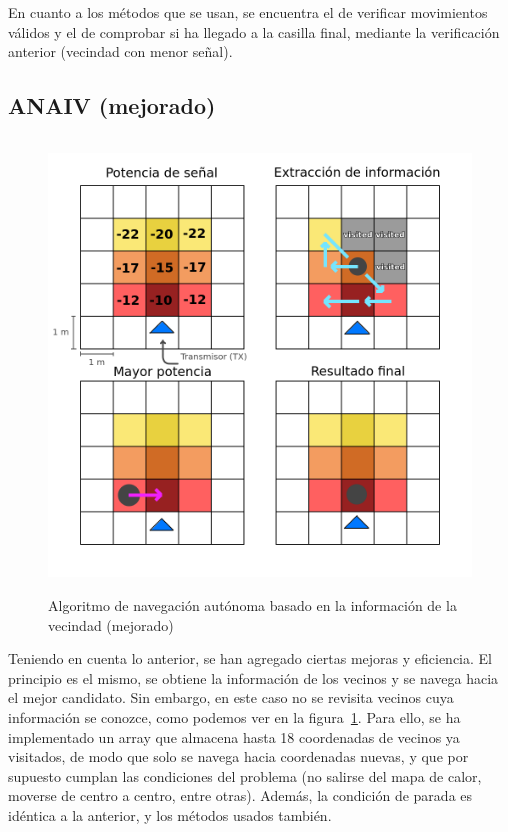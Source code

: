En cuanto a los métodos que se usan, se encuentra el de verificar movimientos válidos y el de comprobar si ha llegado a la casilla final, mediante la verificación anterior (vecindad con menor señal).\\

\subsection{\ac{ANAIV} (mejorado)}
\label{subsec:alg-manual-opt}

\begin{figure} [t]
    \begin{center}
    \includegraphics[height=12cm]{imagenes/cap4/10_algoritmo_optimizado.png}
    \end{center}
    \caption[Algoritmo de navegación autónoma basado en la información de la vecindad (mejorado)]{Algoritmo de navegación autónoma basado en la información de la vecindad (mejorado)}
    \label{fig:opt_algorithm}
\end{figure}

Teniendo en cuenta lo anterior, se han agregado ciertas mejoras y eficiencia. El principio es el mismo, se obtiene la información de los vecinos y se navega hacia el mejor candidato. Sin embargo, en este caso no se revisita vecinos cuya información se conozce, como podemos ver en la figura~\ref{fig:opt_algorithm}. Para ello, se ha implementado un array que almacena hasta 18 coordenadas de vecinos ya visitados, de modo que solo se navega hacia coordenadas nuevas, y que por supuesto cumplan las condiciones del problema (no salirse del mapa de calor, moverse de centro a centro, entre otras). Además, la condición de parada es idéntica a la anterior, y los métodos usados también.\\

